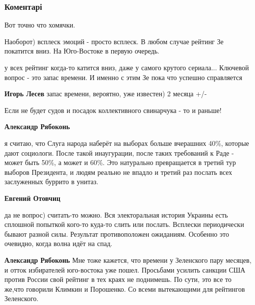  
 
 
 
 
\subsubsection{Коментарі}

\begin{itemize} %
Вот точно что хомячки.

Наоборот) всплеск эмоций - просто всплеск. В любом случае рейтинг Зе покатится вниз. На Юго-Востоке в первую очередь.

\begin{itemize} %

у всех рейтинг когда-то катится вниз, даже у самого крутого сериала... Ключевой
вопрос - это запас времени. И именно с этим Зе пока что успешно справляется

\textbf{Игорь Лесев} запас времени, вероятно, уже известен) 2 месяца +/-

Если не будет судов и посадок коллективного свинарчука - то и раньше!

\textbf{Александр Рябоконь} 

я считаю, что Слуга народа наберёт на выборах больше вчерашних 40\%, которые
дают социологи. После такой инаугурации, после таких требований к Раде - может
быть 50\%, а может и 60\%. Это натурально превращается в третий тур выборов
Президента, и людям реально не впадло и третий раз послать всех заслуженных
буррито в унитаз.

\textbf{Евгений Отовчиц} 

да не вопрос) считать-то можно. Вся электоральная история Украины есть сплошной
попыткой кого-то куда-то слить или послать. Всплески периодически бывают разной
силы. Результат противоположен ожиданиям. Особенно это очевидно, когда волна
идёт на спад.

\textbf{Александр Рябоконь} Мне тоже кажется, что времени у Зеленского пару месяцев, и отток избирателей юго-востока уже пошел. Просьбами усилить санкции США против России свой рейтинг в тех краях не поднимешь. По сути, это все то же,что говорили Климкин и Порошенко. Со всеми вытекающими для рейтингов Зеленского.


\end{itemize}
\end{itemize}
